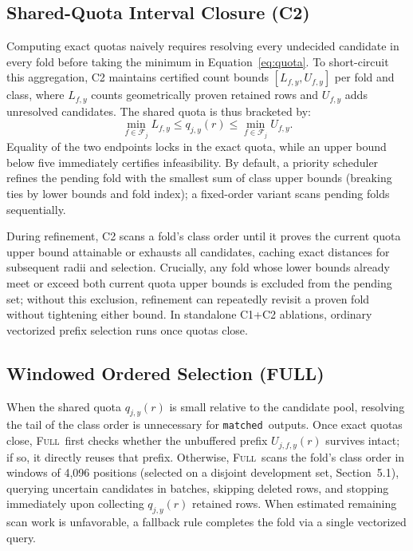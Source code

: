 \documentclass[sigconf, nonacm]{acmart}
\newcommand{\full}{\textsc{Full}}
\newcommand{\matched}{\texttt{matched}}
\begin{document}
\subsection{Shared-Quota Interval Closure (C2)}
Computing exact quotas naively requires resolving every undecided candidate in every fold before taking the minimum in Equation~\ref{eq:quota}. To short-circuit this aggregation, C2 maintains certified count bounds $[L_{f,y},U_{f,y}]$ per fold and class, where $L_{f,y}$ counts geometrically proven retained rows and $U_{f,y}$ adds unresolved candidates. The shared quota is thus bracketed by:
\begin{equation}
\min_{f\in\mathcal{F}_j} L_{f,y}\le q_{j,y}(r)\le\min_{f\in\mathcal{F}_j} U_{f,y}.
\label{eq:interval}
\end{equation}
Equality of the two endpoints locks in the exact quota, while an upper bound below five immediately certifies infeasibility. By default, a priority scheduler refines the pending fold with the smallest sum of class upper bounds (breaking ties by lower bounds and fold index); a fixed-order variant scans pending folds sequentially.

During refinement, C2 scans a fold's class order until it proves the current quota upper bound attainable or exhausts all candidates, caching exact distances for subsequent radii and selection. Crucially, any fold whose lower bounds already meet or exceed both current quota upper bounds is excluded from the pending set; without this exclusion, refinement can repeatedly revisit a proven fold without tightening either bound. In standalone C1+C2 ablations, ordinary vectorized prefix selection runs once quotas close.

\subsection{Windowed Ordered Selection (FULL)}
When the shared quota $q_{j,y}(r)$ is small relative to the candidate pool, resolving the tail of the class order is unnecessary for \matched\ outputs. Once exact quotas close, \full\ first checks whether the unbuffered prefix $U_{j,f,y}(r)$ survives intact; if so, it directly reuses that prefix. Otherwise, \full\ scans the fold's class order in windows of 4{,}096 positions (selected on a disjoint development set, Section~5.1), querying uncertain candidates in batches, skipping deleted rows, and stopping immediately upon collecting $q_{j,y}(r)$ retained rows. When estimated remaining scan work is unfavorable, a fallback rule completes the fold via a single vectorized query.
\end{document}
